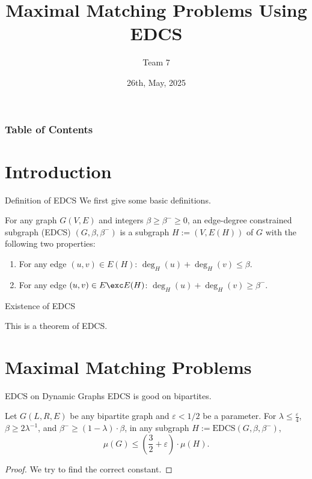 \documentclass{beamer}
\title{Maximal Matching Problems Using EDCS}
\author{Team 7}
\date{26th, May, 2025}
\begin{document}
\begin{frame}
  \titlepage
\end{frame}

\begin{frame}
  \frametitle{Table of Contents}
  \tableofcontents
\end{frame}

\section{Introduction}
\begin{frame}{Definition of EDCS}
    We first give some basic definitions.
    \begin{definition}[\cite{BS15}]
        For any graph $G(V,E)$ and integers $\beta\geq\beta^-\geq0$, 
        an edge-degree constrained subgraph (EDCS) $(G,\beta,\beta^-)$ is a subgraph 
        $H:=(V,E(H))$ of $G$ with the following two properties:
        \begin{enumerate}[label=(P\arabic*),leftmargin=1cm]
            \item For any edge $(u,v)\in E(H)$: $\deg_H(u)+\deg_H(v)\leq\beta$.
            \item For any edge $(u,v)\in E\exc E(H)$: $\deg_H(u)+\deg_H(v)\geq\beta^-$.
        \end{enumerate}
    \end{definition}
\end{frame}

\begin{frame}{Existence of EDCS}
    \begin{theorem}
        This is a theorem of EDCS.
    \end{theorem}
\end{frame}

\section{Maximal Matching Problems}
\begin{frame}{EDCS on Dynamic Graphs}
    EDCS is good on bipartites.
    \begin{lemma}[\cite{AB19}]
        Let $G(L,R,E)$ be any bipartite graph and $\varepsilon < 1/2$ be a parameter. 
        For $\lambda \leq \frac{\varepsilon}{4}$, $\beta \geq 2 \lambda^{-1}$, and $\beta^{-} \geq (1 - \lambda) \cdot \beta$, 
        in any subgraph $H := \mathrm{EDCS}(G, \beta, \beta^-)$, $$\mu(G) \leq \left(\frac{3}{2} + \varepsilon\right) \cdot \mu(H).$$
    \end{lemma}   
    \begin{proof}
        We try to find the correct constant.
    \end{proof} 
\end{frame}
\end{document}
